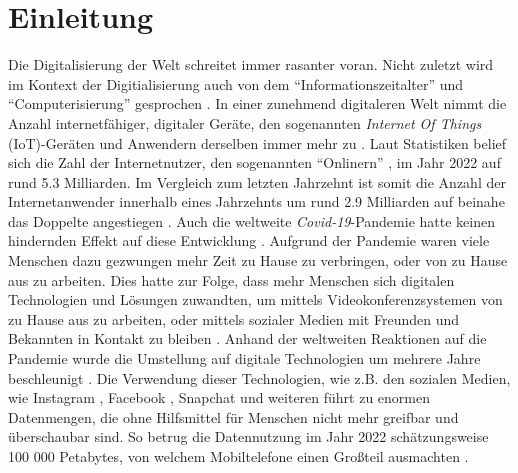 \section{Einleitung}
\label{sec1:intro}
Die Digitalisierung der Welt schreitet immer rasanter voran. Nicht zuletzt wird im Kontext der Digitialisierung auch von dem \enquote{Informationszeitalter} und \enquote{Computerisierung} gesprochen \cite{gabler-digitalisierung}.
In einer zunehmend digitaleren Welt nimmt die Anzahl internetfähiger, digitaler Geräte, den sogenannten \textit{Internet Of Things} (IoT)-Geräten und Anwendern derselben immer mehr zu \cite{statista-iot-devices}.
Laut Statistiken belief sich die Zahl der Internetnutzer, den sogenannten \enquote{Onlinern} \cite{statista-onliner-2022}, im Jahr 2022 auf rund 5.3 Milliarden.
Im Vergleich zum letzten Jahrzehnt ist somit die Anzahl der Internetanwender innerhalb eines Jahrzehnts um rund 2.9 Milliarden auf beinahe das Doppelte angestiegen \cite{statista-onliner-2022}.
Auch die weltweite \textit{Covid-19}-Pandemie hatte keinen hindernden Effekt auf diese Entwicklung \cite{mckinsey-digitalization-covid}.
Aufgrund der Pandemie waren viele Menschen dazu gezwungen mehr Zeit zu Hause zu verbringen, oder von zu Hause aus zu arbeiten.
Dies hatte zur Folge, dass mehr Menschen sich digitalen Technologien und Lösungen zuwandten, um mittels Videokonferenzsystemen von zu Hause aus zu arbeiten, oder mittels sozialer Medien mit Freunden und Bekannten in Kontakt zu bleiben \cite{mckinsey-digitalization-covid, statista-covid-social-media-use}.
Anhand der weltweiten Reaktionen auf die Pandemie wurde die Umstellung auf digitale Technologien um mehrere Jahre beschleunigt \cite{mckinsey-digitalization-covid}.
Die Verwendung dieser Technologien, wie z.B. den sozialen Medien, wie Instagram \cite{instagram}, Facebook \cite{facebook}, Snapchat \cite{snapchat} und weiteren führt zu enormen Datenmengen, die ohne Hilfsmittel für Menschen nicht mehr greifbar und überschaubar sind.
So betrug die Datennutzung im Jahr 2022 schätzungsweise 100 000 Petabytes, von welchem Mobiltelefone einen Großteil ausmachten \cite{global-mobile-data-usage}.

